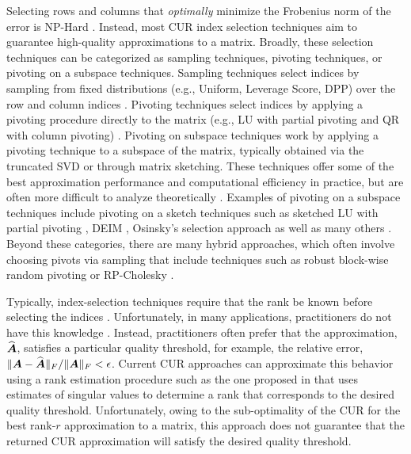 Selecting rows and columns that \textit{optimally} minimize the Frobenius norm of the error is NP-Hard \cite{shitov2021column, civril2009selecting}. Instead, most CUR index selection techniques aim to guarantee high-quality approximations to a matrix. Broadly, these selection techniques can be categorized as sampling techniques, pivoting techniques, or pivoting on a subspace techniques. Sampling techniques select indices by sampling from fixed distributions (e.g., Uniform, Leverage Score, DPP) over the row and column indices \cite{derezinski2021determinantal, frieze2004fast, mahoney2009cur}.  Pivoting techniques select indices by applying a pivoting procedure directly to the matrix (e.g., LU with partial pivoting and QR with column pivoting) \cite{stewart1998matrix}. Pivoting on subspace techniques work by applying a pivoting technique to a subspace of the matrix, typically obtained via the truncated SVD or through matrix sketching. These techniques offer some of the best approximation performance and computational efficiency in practice, but are often more difficult to analyze theoretically \cite{dong2023simpler}. Examples of pivoting on a subspace techniques include pivoting on a sketch techniques such as sketched LU with partial pivoting \cite{dong2023simpler}, DEIM \cite{sorensen2016deim}, Osinsky's selection approach \cite{osinsky2025close} as well as many others \cite{chen2020efficient, cortinovis2024adaptive,duersch2020randomized, osinsky2025close}. Beyond these categories, there are many hybrid approaches, which often involve choosing pivots via sampling that include techniques such as robust block-wise random pivoting \cite{dong2024robust} or RP-Cholesky \cite{chen2025randomly}. 

Typically, index-selection techniques require that the rank be known before selecting the indices \cite{chen2020efficient, cortinovis2024adaptive, dong2023simpler, duersch2020randomized, mahoney2009cur}.  Unfortunately, in many applications, practitioners do not have this knowledge \cite{kramer2024learning, park2025curing, yang2015identifying}. Instead, practitioners often prefer that the approximation, $\widehat{\boldsymbol{A}}$, satisfies a particular quality threshold, for example, the relative error, $\|\boldsymbol{A} - \widehat {\boldsymbol{A}}\|_F / \|\boldsymbol{A}\|_F < \epsilon$. Current CUR approaches can approximate this behavior using a rank estimation procedure such as the one proposed in \cite{meier2024fast} that uses estimates of singular values to determine a rank that corresponds to the desired quality threshold. Unfortunately, owing to the sub-optimality of the CUR for the best rank-$r$ approximation to a matrix, this approach does not guarantee that the returned CUR approximation will satisfy the desired quality threshold.

